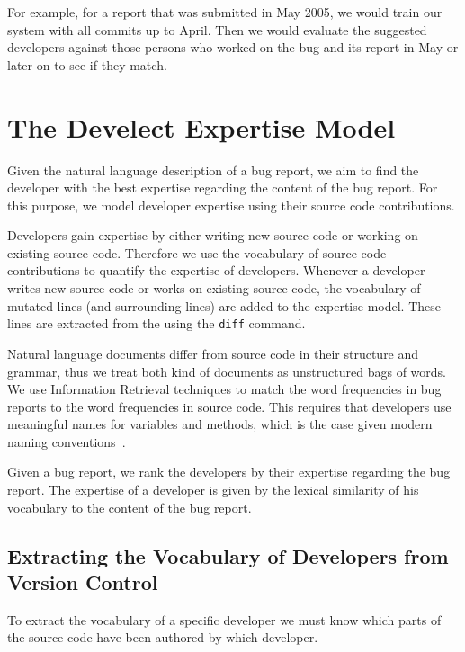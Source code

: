\documentclass[10pt]{book}
\begin{document}
For example, for a report that was submitted in May 2005, we would train our system with all commits up to April. Then we would evaluate the suggested developers against those persons who worked on the bug and its report in May or later on to see if they match.

 

\section{The Develect Expertise Model}\label{sec:algorithm}

Given the natural language description of a bug report, we aim to find the developer with the best expertise regarding the content of the bug report. For this purpose, we model developer expertise using their source code contributions. 

Developers gain expertise by either writing new source code or working on existing source code. Therefore we use the vocabulary of source code contributions to quantify the expertise of developers. Whenever a developer writes new source code or works on existing source code, the vocabulary of mutated lines (and surrounding lines) are added to the expertise model. These lines are extracted from the \VCS using the \verb$diff$ command.

Natural language documents differ from source code in their structure and grammar, thus we treat both kind of documents as unstructured bags of words. We use Information Retrieval techniques to match the word frequencies in bug reports to the word frequencies in source code. This requires that developers use meaningful names \eg for variables and methods, which is the case given modern naming conventions~\cite{Kuhn07a}. 

Given a bug report, we rank the developers by their expertise regarding the bug report. The expertise of a developer is given by the lexical similarity of his vocabulary to the content of the bug report.

\subsection{Extracting the Vocabulary of Developers from Version Control}

To extract the vocabulary of a specific developer we must know which parts of the source code have been authored by which developer. 
\end{document}
